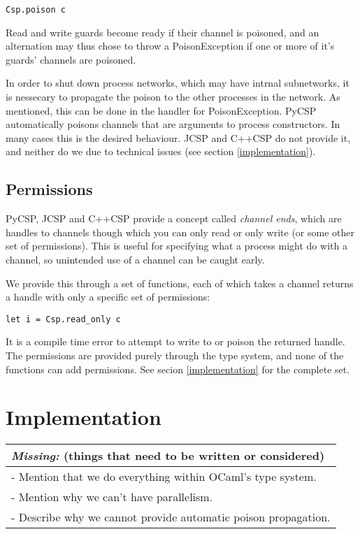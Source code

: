 \documentclass[a4paper,12pt]{article}
\newcommand{\missing}[1]{
  \begin{tabular}{|p{11cm}|}
    \hline
    \emph{Missing:} {\scriptsize (things that need to be written or considered)} \\
    \hline
    #1
    \hline
  \end{tabular}
}
\begin{document}
\begin{verbatim}
Csp.poison c 
\end{verbatim}

Read and write guards become ready if their channel is poisoned, and an alternation may thus chose to 
throw a PoisonException if one or more of it's guards' channels are poisoned.

In order to shut down process networks, which may have intrnal subnetworks, it is nessecary to propagate
the poison to the other processes in the network. As mentioned, this can be done in the handler for
PoisonException. PyCSP automatically poisons channels that are arguments to process constructors. In 
many cases this is the desired behaviour. JCSP and C++CSP do not provide it, and neither do we due to
technical issues (see section \ref{implementation}).

\subsection{Permissions}

PyCSP, JCSP and C++CSP provide a concept called \emph{channel ends}, which are handles to channels
though which you can only read or only write (or some other set of permissions). This is useful for
specifying what a process might do with a channel, so unintended use of a channel can be caught
early.

We provide this through a set of functions, each of which takes a channel returns a handle with only
a specific set of permissions:

\begin{verbatim}
let i = Csp.read_only c
\end{verbatim}

It is a compile time error to attempt to write to or poison the returned handle. The permissions are 
provided purely through the type system, and none of the functions can add permissions. 
See secion \ref{implementation} for the complete set.

\section{Implementation}
\missing{
- Mention that we do everything within OCaml's type system.\\
- Mention why we can't have parallelism.\\
- Describe why we cannot provide automatic poison propagation.\\
}
\label{implementation}
\end{document}

